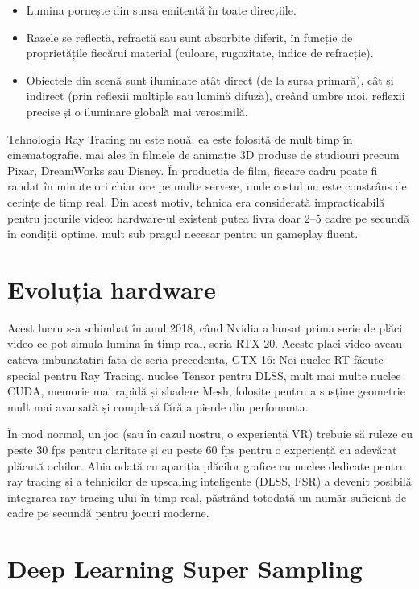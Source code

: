 \begin{itemize}
    \item Lumina pornește din sursa emitentă în toate direcțiile.
    \item Razele se reflectă, refractă sau sunt absorbite diferit, în funcție de proprietățile fiecărui material (culoare, rugozitate, indice de refracție).
    \item Obiectele din scenă sunt iluminate atât direct (de la sursa primară), cât și indirect (prin reflexii multiple sau lumină difuză), creând umbre moi, reflexii precise și o iluminare globală mai verosimilă.
\end{itemize}

Tehnologia Ray Tracing nu este nouă; ea este folosită de mult timp în cinematografie, mai ales în filmele de animație 3D produse de studiouri precum Pixar, DreamWorks sau Disney. În producția de film, fiecare cadru poate fi randat în minute ori chiar ore pe multe servere, unde costul nu este constrâns de cerințe de timp real. Din acest motiv, tehnica era considerată impracticabilă pentru jocurile video: hardware-ul existent putea livra doar 2–5 cadre pe secundă în condiții optime, mult sub pragul necesar pentru un gameplay fluent.


\section{Evoluția hardware}

Acest lucru s-a schimbat în anul 2018, când Nvidia a lansat prima serie de plăci video ce pot simula lumina în timp real, seria RTX 20. Aceste placi video aveau cateva imbunatatiri fata de seria precedenta, GTX 16: Noi nuclee RT făcute special pentru Ray Tracing, nuclee Tensor pentru DLSS, mult mai multe nuclee CUDA, memorie mai rapidă și shadere Mesh, folosite pentru a susține geometrie mult mai avansată și complexă fără a pierde din perfomanta.

În mod normal, un joc (sau în cazul nostru, o experiență VR) trebuie să ruleze cu peste 30 fps pentru claritate și cu peste 60 fps pentru o experiență cu adevărat plăcută ochilor. Abia odată cu apariția plăcilor grafice cu nuclee dedicate pentru ray tracing și a tehnicilor de upscaling inteligente (DLSS, FSR) a devenit posibilă integrarea ray tracing-ului în timp real, păstrând totodată un număr suficient de cadre pe secundă pentru jocuri moderne.

\section{\textbf{D}eep \textbf{L}earning \textbf{S}uper \textbf{S}ampling}

